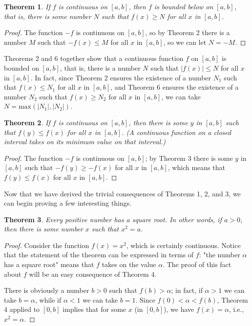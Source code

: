 \documentclass{article}
\newtheorem{theorem}{Theorem}
\begin{document}
\begin{theorem}
  If $f$ is continuous on $[a, b]$, then $f$ is bounded below on $[a, b]$, that
  is, there is some number $N$ such that $f(x) \geq N$ for all $x$ in $[a, b]$.
\end{theorem}

\begin{proof}
  The function $-f$ is continuous on $[a, b]$, so by Theorem 2 there is a
  number $M$ such that $-f(x) \leq M$ for all $x$ in $[a, b]$, so we can let $N
  = -M$.
\end{proof}

Theorems 2 and 6 together show that a continuous function $f$ on $[a, b]$ is
bounded on $[a, b]$, that is, there is a number $N$ such that $|f(x)| \leq N$
for all $x$ in $[a, b]$. In fact, since Theorem 2 ensures the existence of a
number $N_1$ such that $f(x) \leq N_1$ for all $x$ in $[a, b]$, and Theorem 6
ensures the existence of a number $N_2$ such that $f(x) \geq N_2$ for all $x$
in $[a, b]$, we can take $N = \mathrm{max}(|N_1|, |N_2|)$.

\begin{theorem}
  If $f$ is continuous on $[a, b]$, then there is some $y$ in $[a, b]$ such
  that $f(y) \leq f(x)$ for all $x$ in $[a, b]$.
  (A continuous function on a closed interval takes on its minimum value on
  that interval.)
\end{theorem}

\begin{proof}
  The function $-f$ is continuous on $[a, b]$; by Theorem 3 there is some $y$
  in $[a, b]$ such that $-f(y) \geq -f(x)$ for all $x$ in $[a, b]$, which means
  that $f(y) \leq f(x)$ for all $x$ in $[a, b]$.
\end{proof}

Now that we have derived the trivial consequences of Theorems 1, 2, and 3, we
can begin proving a few interesting things.

\begin{theorem}
  Every positive number has a square root. In other words, if $a > 0$, then
  there is some number $x$ such that $x^2 = a$.
\end{theorem}

\begin{proof}
  Consider the function $f(x) = x^2$, which is certainly continuous. Notice
  that the statement of the theorem can be expressed in terms of $f$: "the
  number $\alpha$ has a square root" means that $f$ takes on the value
  $\alpha$. The proof of this fact about $f$ will be an easy consequence of
  Theorem 4.

  There is obviously a number $b > 0$ such that $f(b) > \alpha$; in fact, if
  $\alpha > 1$ we can take $b = \alpha$, while if $\alpha < 1$ we can take $b =
  1$. Since $f(0) < \alpha < f(b)$, Theorem 4 applied to $[0, b]$ implies that
  for some $x$ (in $[0, b]$), we have $f(x) = \alpha$, i.e., $x^2 = \alpha$.
\end{proof}
\end{document}
